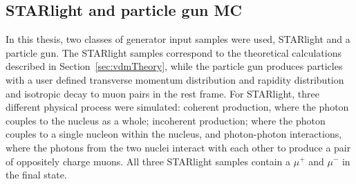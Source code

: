   \DIFdelbegin \subsection{}
\addtocounter{subsection}{-1}%
{%
}
{%
}
{%
}

\DIFdelend \subsection{STARlight and particle gun MC}
    In this thesis, two classes of generator input samples were used, 
      STARlight \cite{vmd1999, starlight} and a particle gun.
    The STARlight samples correspond to the theoretical calculations 
      described in Section~\ref{sec:vdmTheory}, while the particle gun produces
      particles with a user defined transverse momentum distribution and 
      rapidity distribution and isotropic decay to muon pairs in the \JPsi{} 
      rest frame. 
    For STARlight, three different physical process were simulated:
      coherent \JPsi{} production, where the photon couples to the nucleus as
      a whole; incoherent \JPsi{} production; where the photon couples to a
      single nucleon within the nucleus, and photon-photon interactions, where 
      the photons from the two nuclei interact with each other to produce a 
      pair of oppositely charge muons.
    All three STARlight samples contain a $\mu^{+}$ and $\mu^{-}$ in the final 
      state.

